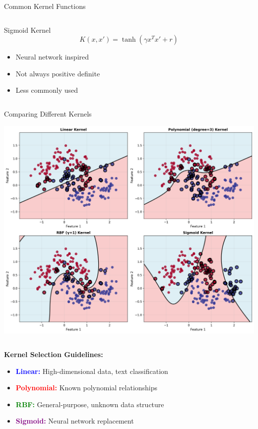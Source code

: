 \documentclass[8pt,aspectratio=1610]{beamer}
\begin{document}
\begin{frame}{Common Kernel Functions}
\begin{columns}[t]
\begin{column}{0.48\textwidth}
\begin{block}{Sigmoid Kernel}
$$K(x, x') = \tanh(\gamma x^T x' + r)$$
\begin{itemize}
\setlength{\itemsep}{1pt}
\item Neural network inspired
\item Not always positive definite
\item Less commonly used
\end{itemize}
\end{block}
\end{column}
\end{columns}
\end{frame}

\begin{frame}{Comparing Different Kernels}
\begin{center}
\includegraphics[width=\textwidth]{../figures/different_kernels.png}
\end{center}

\begin{columns}[t]
\begin{column}{0.48\textwidth}
\textbf{Kernel Selection Guidelines:}
\begin{itemize}
\setlength{\itemsep}{1pt}
\item \textcolor{blue}{\textbf{Linear:}} High-dimensional data, text classification
\item \textcolor{red}{\textbf{Polynomial:}} Known polynomial relationships
\item \textcolor{green}{\textbf{RBF:}} General-purpose, unknown data structure
\item \textcolor{purple}{\textbf{Sigmoid:}} Neural network replacement
\end{itemize}
\end{column}


\end{columns}
\end{frame}
\end{document}
